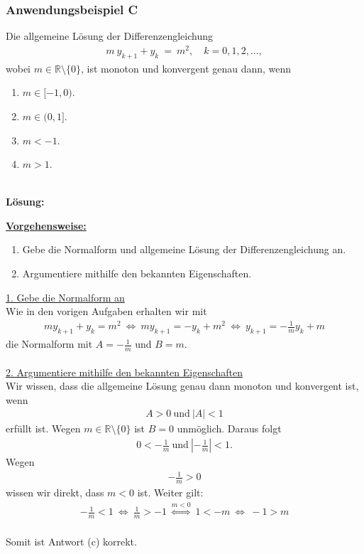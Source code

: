 \subsubsection*{Anwendungsbeispiel C}
Die allgemeine Lösung der Differenzengleichung
\begin{align*}
m \ y_{k+1} + y_k  \ = \ m^2, \quad k=0,1,2,...,
\end{align*}
wobei $m \in \mathbb{R} \setminus \lbrace 0 \rbrace$, ist monoton und konvergent genau dann, wenn
\renewcommand{\labelenumi}{(\alph{enumi})}
\begin{enumerate}
\item 
$m \in [-1,0)$.
\item
$m \in (0,1]$.
\item
$m < -1$.
\item
$m> 1$.
\end{enumerate}
\ \\
\textbf{Lösung:}
\begin{mdframed}
\underline{\textbf{Vorgehensweise:}}
\renewcommand{\labelenumi}{\theenumi.}
\begin{enumerate}
\item Gebe die Normalform und allgemeine Lösung der Differenzengleichung an.
\item 
Argumentiere mithilfe den bekannten Eigenschaften.
\end{enumerate}
\end{mdframed}

\underline{1. Gebe die Normalform an }\\
Wie in den vorigen Aufgaben erhalten wir mit
\begin{align*}
m  y_{k+1} + y_k   =  m^2
 \ \Leftrightarrow \
m y_{k+1} = - y_k + m^2
\ \Leftrightarrow \
y_{k+1} = - \frac{1}{m} y_k + m 
\end{align*}
die Normalform mit $A = - \frac{1}{m}$ und $B = m$.
\\
\\
\underline{2. Argumentiere mithilfe den bekannten Eigenschaften}\\
Wir wissen, dass die allgemeine Lösung genau dann monoton und konvergent ist, wenn
\begin{align*}
A > 0  \ \text{und} \ |A| < 1
\end{align*}
erfüllt ist.
Wegen $m \in \mathbb{R} \setminus \lbrace 0 \rbrace$ ist $B=0$ unmöglich.
Daraus folgt
\begin{align*}
0 < - \frac{1}{m} \ \textrm{und} \ \left| -\frac{1}{m} \right| < 1. 
\end{align*}
Wegen 
\begin{align*}
-\frac{1}{m} > 0 
\end{align*}
wissen wir direkt, dass $m < 0 $ ist.
Weiter gilt:
\begin{align*}
- \frac{1}{m} < 1 
\ \Leftrightarrow \
\frac{1}{m} >-1
 \ \overset{ m  < 0}{\Leftrightarrow }\
 1 < -m 
  \ \Leftrightarrow \
-1 > m
\end{align*}
\\

Somit ist Antwort (c) korrekt.
